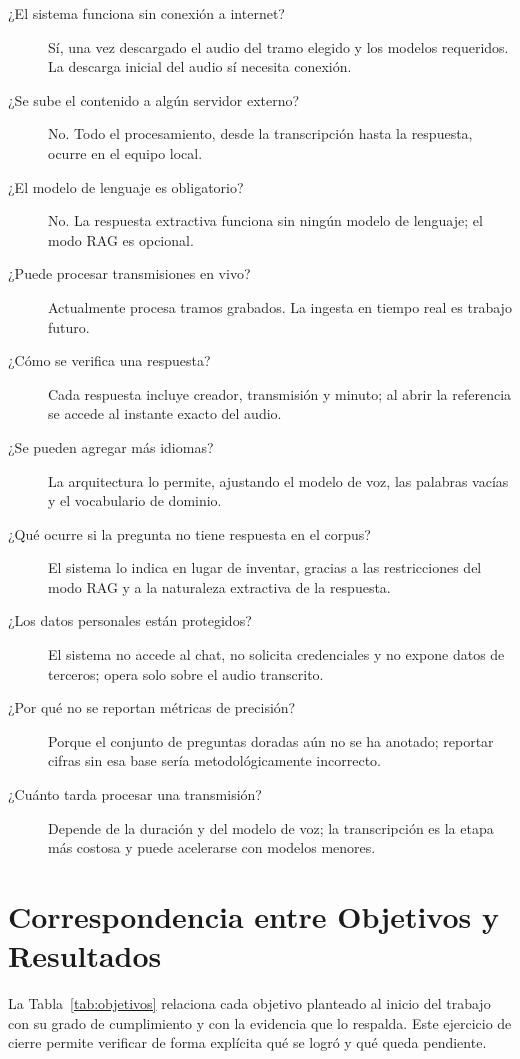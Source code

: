\documentclass[12pt,a4paper]{article}
\begin{document}
\begin{description}
  \item[¿El sistema funciona sin conexión a internet?] Sí, una vez descargado el audio del tramo elegido y los modelos requeridos. La descarga inicial del audio sí necesita conexión.
  \item[¿Se sube el contenido a algún servidor externo?] No. Todo el procesamiento, desde la transcripción hasta la respuesta, ocurre en el equipo local.
  \item[¿El modelo de lenguaje es obligatorio?] No. La respuesta extractiva funciona sin ningún modelo de lenguaje; el modo RAG es opcional.
  \item[¿Puede procesar transmisiones en vivo?] Actualmente procesa tramos grabados. La ingesta en tiempo real es trabajo futuro.
  \item[¿Cómo se verifica una respuesta?] Cada respuesta incluye creador, transmisión y minuto; al abrir la referencia se accede al instante exacto del audio.
  \item[¿Se pueden agregar más idiomas?] La arquitectura lo permite, ajustando el modelo de voz, las palabras vacías y el vocabulario de dominio.
  \item[¿Qué ocurre si la pregunta no tiene respuesta en el corpus?] El sistema lo indica en lugar de inventar, gracias a las restricciones del modo RAG y a la naturaleza extractiva de la respuesta.
  \item[¿Los datos personales están protegidos?] El sistema no accede al chat, no solicita credenciales y no expone datos de terceros; opera solo sobre el audio transcrito.
  \item[¿Por qué no se reportan métricas de precisión?] Porque el conjunto de preguntas doradas aún no se ha anotado; reportar cifras sin esa base sería metodológicamente incorrecto.
  \item[¿Cuánto tarda procesar una transmisión?] Depende de la duración y del modelo de voz; la transcripción es la etapa más costosa y puede acelerarse con modelos menores.
\end{description}



\section{Correspondencia entre Objetivos y Resultados}
\label{anexo:objetivos}

La Tabla~\ref{tab:objetivos} relaciona cada objetivo planteado al inicio del trabajo con su grado de cumplimiento y con la evidencia que lo respalda. Este ejercicio de cierre permite verificar de forma explícita qué se logró y qué queda pendiente.
\end{document}
